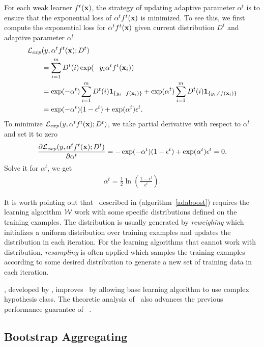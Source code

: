 {For each weak learner $f^t(\mathbf {x})$, the strategy of updating adaptive parameter $\alpha^t$ is to ensure that the exponential loss of $\alpha^tf^t(\mathbf {x})$ is minimized.
To see this, we first compute the exponential loss for $\alpha^tf^t(\mathbf {x})$ given current distribution $D^t$ and adaptive parameter $\alpha^t$
\begin{align*}
	\mathcal{L}_{exp}&(y,\alpha^tf^t(\mathbf {x});D^t) \\
	&= \sum_{i=1}^mD^t(i)\exp(-y_i\alpha^tf^t(\mathbf {x}_i))\\
	&=\exp(-\alpha^t)\sum_{i=1}^mD^t(i)\mathbf{1}_{\{y_i=f(\mathbf {x}_i)\}} + \exp(\alpha^t)\sum_{i=1}^mD^t(i)\mathbf{1}_{\{y_i\neq f(\mathbf {x}_i)\}}\\
	&=\exp(-\alpha^t)(1-\epsilon^t) + \exp(\alpha^t)\epsilon^t.
\end{align*}
To minimize $\mathcal{L}_{exp}(y,\alpha^tf^t(\mathbf {x});D^t)$, we take partial derivative with respect to $\alpha^t$ and set it to zero
\begin{align*}
	\frac{\partial\mathcal{L}_{exp}(y,\alpha^tf^t(\mathbf {x});D^t)}{\partial\alpha^t} = -\exp(-\alpha^t)(1-\epsilon^t) + \exp(\alpha^t)\epsilon^t=0.
\end{align*}
Solve it for $\alpha^t$, we get
\begin{align*}
	\alpha^{t} = \frac{1}{2}\ln\left(\frac{1-\epsilon^t}{\epsilon^t}\right).
\end{align*}

It is worth pointing out that \adaboost\ described in (algorithm~\ref{adaboost}) requires the learning algorithm $\mathcal{W}$ work with some specific distributions defined on the training examples.
The distribution is usually generated by \textit{reweighing} which initializes a uniform distribution over training examples and updates the distribution in each iteration.
For the learning algorithms that cannot work with distribution, \textit{resampling} is often applied which samples the training examples according to some desired distribution to generate a new set of training data in each iteration.

\deepboosting, developed by \citet{Cortes14deep}, improves \adaboost\ by allowing base learning algorithm to use complex hypothesis class.
The theoretic analysis of \deepboosting\ also advances the previous performance guarantee of \adaboost\ \citep{Schapire97boosting,Koltchinskii00empirical}.




\subsection{Bootstrap Aggregating} \label{sc_ba}

}

